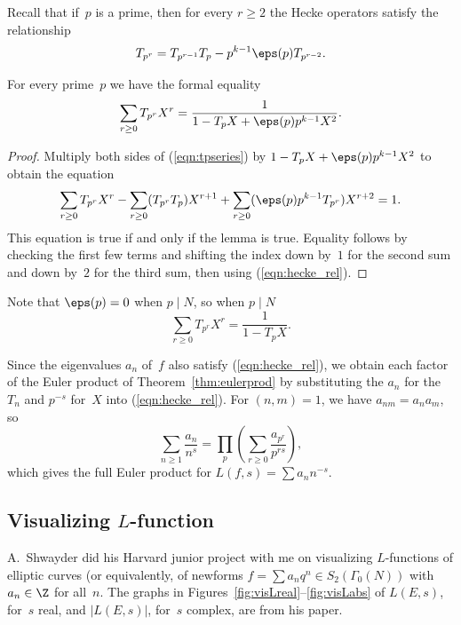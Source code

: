 \documentclass{report}
\begin{document}
Recall that if~$p$ is a prime, then for every $r\geq 2$ the Hecke
operators satisfy the relationship
\begin{equation}\label{eqn:hecke_rel}
  T_{p^r} = T_{p^{r-1}} T_p - p^{k-1}\eps(p) T_{p^{r-2}}.
\end{equation}
\begin{lemma}
For every prime~$p$ we have the formal equality
\begin{equation}\label{eqn:tpseries}
  \sum_{r\geq 0} T_{p^r} X^r = \frac{1}{1-T_p X +\eps(p) p^{k-1} X^2}.
\end{equation}
\end{lemma}
\begin{proof}
Multiply both sides of (\ref{eqn:tpseries}) by
$1-T_p X + \eps(p) p^{k-1}X^2$ to obtain the equation
$$
\sum_{r\geq 0} T_{p^r}X^r - \sum_{r\geq 0} (T_{p^r}T_p)X^{r+1} +
\sum_{r\geq 0} (\eps(p) p^{k-1} T_{p^r}) X^{r+2} = 1.
$$
This equation is true if and only if the lemma is true.
Equality follows by checking the first few terms and shifting the
index down by~$1$ for the second sum and down by~$2$ for the third
sum, then using (\ref{eqn:hecke_rel}).
\end{proof}
Note that $\eps(p)=0$ when $p \mid N$, so when $p\mid N$
$$
  \sum_{r\geq 0} T_{p^r} X^r = \frac{1}{1-T_p X}.
$$

Since the eigenvalues $a_n$ of~$f$ also satisfy (\ref{eqn:hecke_rel}),
we obtain each factor of the Euler product of
Theorem~\ref{thm:eulerprod} by substituting the $a_n$ for the $T_n$
and $p^{-s}$ for~$X$ into (\ref{eqn:hecke_rel}).
For $(n,m)=1$, we have $a_{nm}=a_n a_m$, so
$$
 \sum_{n\geq 1} \frac{a_n}{n^s}
   = \prod_{p} \left(\sum_{r\geq 0} \frac{a_{p^r}}{p^{rs}}\right),
$$
which gives the full Euler product for $L(f,s)=\sum a_n n^{-s}$.

\subsection{Visualizing $L$-function}
A.~Shwayder did his Harvard junior project with me on
visualizing $L$-functions of elliptic curves (or equivalently, of
newforms $f=\sum a_n q^n \in S_2(\Gamma_0(N))$ with $a_n\in\Z$ for
all~$n$.  The graphs in Figures~\ref{fig:visLreal}--\ref{fig:visLabs}
of $L(E,s)$, for~$s$ real, and $|L(E,s)|$, for~$s$ complex, are from
his paper.
\end{document}
